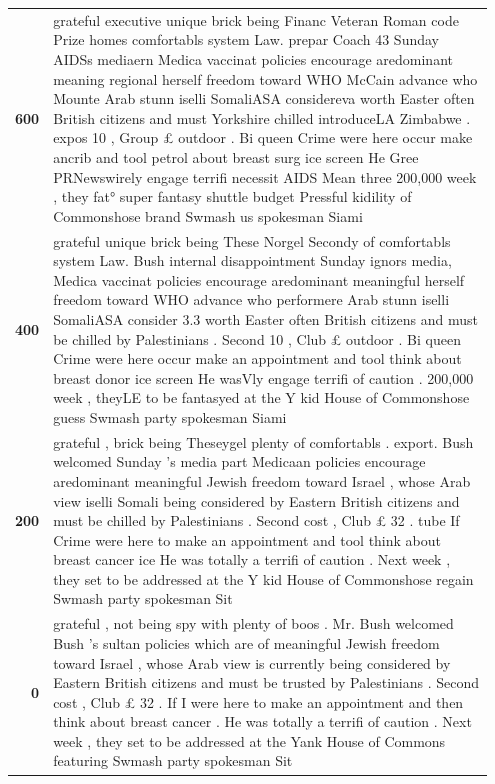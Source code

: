 {\begin{tabular}{rp{0.95\linewidth}}
\textbf{600} &\strut{}grateful executive unique brick being Financ Veteran Roman code Prize homes comfortabls system Law. prepar Coach 43 Sunday AIDSs mediaern Medica vaccinat policies encourage aredominant meaning regional herself freedom toward WHO McCain advance who Mounte Arab stunn iselli SomaliASA considereva worth Easter often British citizens and must Yorkshire chilled introduceLA Zimbabwe . expos 10 , Group £ outdoor . Bi queen Crime were here occur make ancrib and tool petrol about breast surg ice screen He Gree PRNewswirely engage terrifi necessit AIDS Mean three 200,000 week , they fat° super fantasy shuttle budget Pressful kidility of Commonshose brand Swmash us spokesman Siami\\
\textbf{400} &\strut{}grateful  unique brick being These Norgel Secondy of comfortabls system Law. Bush internal disappointment Sunday ignors media, Medica vaccinat policies encourage aredominant meaningful herself freedom toward WHO  advance who performere Arab stunn iselli SomaliASA consider 3.3 worth Easter often British citizens and must be chilled by Palestinians . Second 10 , Club £ outdoor . Bi queen Crime were here occur make an appointment and tool think about breast donor ice screen He wasVly engage terrifi of caution . 200,000 week , theyLE to be fantasyed at the Y kid House of Commonshose guess Swmash party spokesman Siami\\
\textbf{200} &\strut{}grateful , brick being Theseygel plenty of comfortabls . export. Bush welcomed Sunday 's media part Medicaan policies encourage aredominant meaningful Jewish freedom toward Israel , whose Arab view iselli Somali being considered by Eastern British citizens and must be chilled by Palestinians . Second cost , Club £ 32 . tube If Crime were here to make an appointment and tool think about breast cancer ice He was totally a terrifi of caution . Next week , they set to be addressed at the Y kid House of Commonshose regain Swmash party spokesman Sit\\
\textbf{0} &\strut{}grateful , not being spy with plenty of boos . Mr. Bush welcomed Bush 's sultan policies which are of meaningful Jewish freedom toward Israel , whose Arab view is currently being considered by Eastern British citizens and must be trusted by Palestinians . Second cost , Club £ 32 . If I were here to make an appointment and then think about breast cancer . He was totally a terrifi of caution . Next week , they set to be addressed at the Yank House of Commons featuring Swmash party spokesman Sit\\
\end{tabular}
}